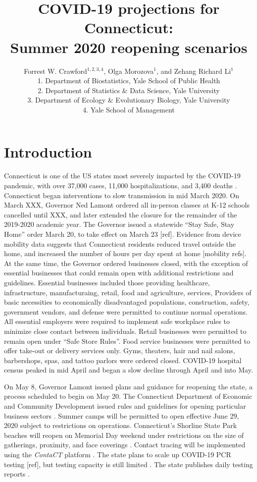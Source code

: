 \documentclass[11pt]{article}
\title{COVID-19 projections for Connecticut: \\ Summer 2020 reopening scenarios}
\author{
  Forrest W. Crawford$^{1,2,3,4}$,
  Olga Morozova$^{1}$, 
  and
  Zehang Richard Li$^1$
  \\[1em]
\small 1. Department of Biostatistics, Yale School of Public Health \\
\small 2. Department of Statistics \& Data Science, Yale University \\
\small 3. Department of Ecology \& Evolutionary Biology, Yale University \\
\small 4. Yale School of Management }
\begin{document}
\maketitle


\section*{Introduction}

Connecticut is one of the US states most severely impacted by the COVID-19 pandemic, with over 37,000 cases, 11,000 hospitalizations, and 3,400 deaths \citep{nyt2020Connecticut,atlantic2020data}. 
Connecticut began interventions to slow transmission in mid March 2020.  On March XXX, Governor Ned Lamont ordered all in-person classes at K-12 schools cancelled until XXX, and later extended the closure for the remainder of the 2019-2020 academic year.  The Governor issued a statewide ``Stay Safe, Stay Home'' order March 20, to take effect on March 23 [ref].  Evidence from device mobility data suggests that Connecticut residents reduced travel outside the home, and increased the number of hours per day spent at home [mobility refs].  At the same time, the Governor ordered businesses closed, with the exception of essential businesses that could remain open with additional restrictions and guidelines.  Essential businesses included those providing healthcare, infrastructure, manufacturaing, retail, food and agriculture, services, Providers of basic necessities to economically disadvantaged populations, construction, safety, government vendors, and defense were permitted to continue normal operations.  All essential employers were required to implement safe workplace rules to minimize close contact between individuals.  Retail businesses were permitted to remain open under ``Safe Store Rules''. Food service businesses were permitted to offer take-out or delivery services only. Gyms, theaters, hair and nail salons, barbershops, spas, and tattoo parlors were ordered closed.  COVID-19 hospital census peaked in mid April and began a slow decline through April and into May.   



On May 8, Governor Lamont issued plans and guidance for reopening the state, a process scheduled to begin on May 20.  The Connecticut Department of Economic and Community Development issued rules and guidelines for opening particular business sectors \citep{decd2020coronavirus}. Summer camps will be permitted to open effective June 29, 2020 subject to restrictions on operations.  Connecticut's Shorline State Park beaches will reopen on Memorial Day weekend under restrictions on the size of gatherings, proximity, and face coverings \citep{ct2020parks}.  Contact tracing will be implemented using the \emph{ContaCT} platform \citep{ct2020contact}.  The state plans to scale up COVID-19 PCR testing [ref], but testing capacity is still limited \cite{thomas2020surge}. The state publishes daily testing reports \citep[e.g.][]{ct2020testing}. 
\end{document}
